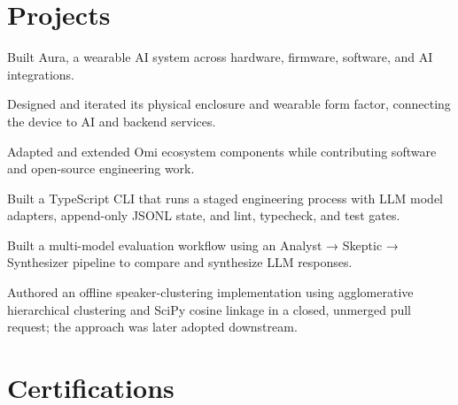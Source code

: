 \documentclass{../../templates/1/resume}
\begin{document}
\section{Projects}
\begin{resumeitemize}
\item Built Aura, a wearable AI system across hardware, firmware, software, and AI integrations.
\item Designed and iterated its physical enclosure and wearable form factor, connecting the device to AI and backend services.
\item Adapted and extended Omi ecosystem components while contributing software and open-source engineering work.
\end{resumeitemize}
\begin{resumeitemize}
\item Built a TypeScript CLI that runs a staged engineering process with LLM model adapters, append-only JSONL state, and lint, typecheck, and test gates.
\end{resumeitemize}
\begin{resumeitemize}
\item Built a multi-model evaluation workflow using an Analyst → Skeptic → Synthesizer pipeline to compare and synthesize LLM responses.
\end{resumeitemize}
\begin{resumeitemize}
\item Authored an offline speaker-clustering implementation using agglomerative hierarchical clustering and SciPy cosine linkage in a closed, unmerged pull request; the approach was later adopted downstream.
\end{resumeitemize}
\section{Certifications}
\end{document}
